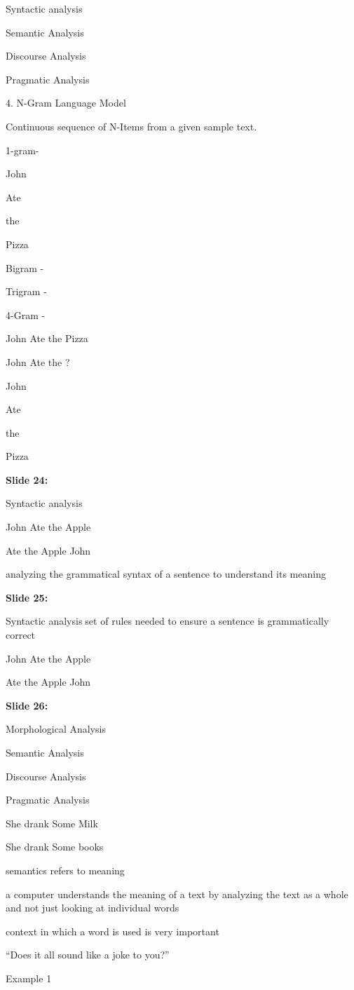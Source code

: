 \documentclass[11pt,a4paper]{article}
\begin{document}
Syntactic analysis

Semantic Analysis

Discourse Analysis

Pragmatic Analysis

4. N-Gram Language Model

Continuous sequence of N-Items from a given sample text.

1-gram-

John

Ate

the

Pizza

Bigram -

Trigram -

4-Gram -

John	Ate	the	Pizza

John Ate the ?

John

Ate

the

Pizza

\textbf{Slide 24:}

Syntactic analysis

John Ate the Apple

Ate	the Apple John

analyzing the grammatical syntax of a sentence to understand its meaning

\textbf{Slide 25:}

Syntactic analysisset of rules needed to ensure a sentence is grammatically correct

John Ate the Apple

Ate	the Apple John

\textbf{Slide 26:}

Morphological Analysis

Semantic Analysis

Discourse Analysis

Pragmatic Analysis

She drank Some Milk

She drank Some books

semantics refers to meaning

a computer understands the meaning of a text by analyzing the text as a whole and not just looking at individual words

context in which a word is used is very important

“Does it all sound like a joke to you?”

Example 1
\end{document}
